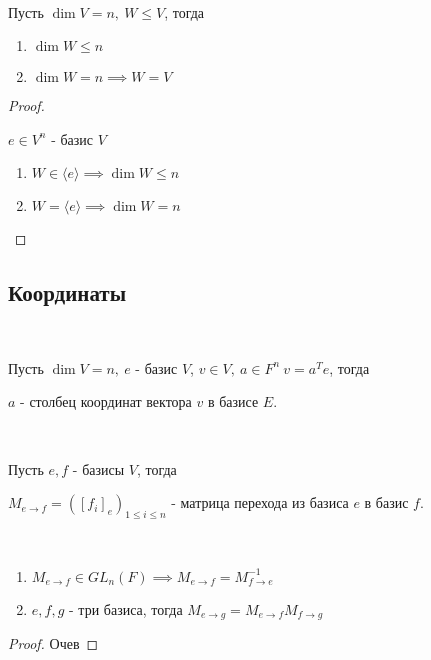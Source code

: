 \begin{theorem-non}~

    Пусть $\dim V = n, ~ W \le V$, тогда

    \begin{enumerate}
        \item $\dim W \le n$
        \item $\dim W = n \implies W = V$
    \end{enumerate}
\end{theorem-non}

\begin{proof}~

    $e \in V^n$ - базис $V$
    \begin{enumerate}
        \item $W \in \langle e \rangle \implies \dim W \le n$
        \item $W = \langle e \rangle \implies \dim W = n$
    \end{enumerate}
\end{proof}

\subsection{Координаты}

\begin{defn}~

    Пусть $\dim V = n,~ e$ - базис $V$, $v \in V, ~ a \in F^n ~ v = a^Te$, тогда

    $a$ - столбец координат вектора $v$ в базисе $E$.
\end{defn}

\begin{defn}~

    Пусть $e, f$ - базисы $V$, тогда

    $M_{e \to f} = ([f_i]_e)_{1 \le i \le n}$ - матрица перехода из базиса $e$ в базис $f$.
\end{defn}

\begin{theorem-non}~

    \begin{enumerate}
        \item $M_{e \to f} \in GL_n(F) \implies M_{e \to f} = M_{f \to e}^{-1}$
        \item $e, f, g$ - три базиса, тогда $M_{e \to g} = M_{e \to f}M_{f \to g}$
    \end{enumerate}
    
\end{theorem-non}

\begin{proof}
    Очев
\end{proof}